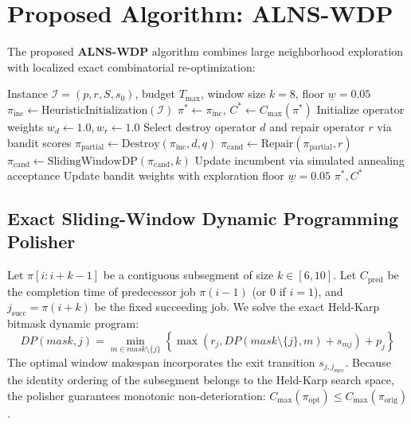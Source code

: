 \documentclass[journal]{IEEEtran}
\begin{document}
\section{Proposed Algorithm: ALNS-WDP}
\label{sec:algorithm}

The proposed \textbf{ALNS-WDP} algorithm combines large neighborhood exploration with localized exact combinatorial re-optimization:

\begin{algorithm}[htbp]
\caption{ALNS-WDP Core Framework}
\label{alg:alns_wdp}
\begin{algorithmic}[1]
\Require Instance $\mathcal{I} = (p, r, S, s_0)$, budget $T_{\max}$, window size $k=8$, floor $\underline{w}=0.05$
\State $\pi_{\text{inc}} \gets \text{HeuristicInitialization}(\mathcal{I})$
\State $\pi^* \gets \pi_{\text{inc}}$, $C^* \gets C_{\max}(\pi^*)$
\State Initialize operator weights $w_d \gets 1.0, w_r \gets 1.0$
    \State Select destroy operator $d$ and repair operator $r$ via bandit scores
    \State $\pi_{\text{partial}} \gets \text{Destroy}(\pi_{\text{inc}}, d, q)$
    \State $\pi_{\text{cand}} \gets \text{Repair}(\pi_{\text{partial}}, r)$
        \State $\pi_{\text{cand}} \gets \text{SlidingWindowDP}(\pi_{\text{cand}}, k)$
    \EndIf
    \State Update incumbent via simulated annealing acceptance
    \State Update bandit weights with exploration floor $\underline{w} = 0.05$
\EndWhile
\State \Return $\pi^*, C^*$
\end{algorithmic}
\end{algorithm}

\subsection{Exact Sliding-Window Dynamic Programming Polisher}
Let $\pi[i : i+k-1]$ be a contiguous subsegment of size $k \in [6, 10]$. Let $C_{\text{pred}}$ be the completion time of predecessor job $\pi(i-1)$ (or 0 if $i=1$), and $j_{\text{succ}} = \pi(i+k)$ be the fixed succeeding job. We solve the exact Held-Karp bitmask dynamic program:
\begin{equation}
    DP(mask, j) = \min_{m \in mask \setminus \{j\}} \left\{ \max\left(r_j, DP(mask \setminus \{j\}, m) + s_{mj}\right) + p_j \right\}
\end{equation}
The optimal window makespan incorporates the exit transition $s_{j, j_{\text{succ}}}$. Because the identity ordering of the subsegment belongs to the Held-Karp search space, the polisher guarantees monotonic non-deterioration: $C_{\max}(\pi_{\text{opt}}) \le C_{\max}(\pi_{\text{orig}})$.
\end{document}
